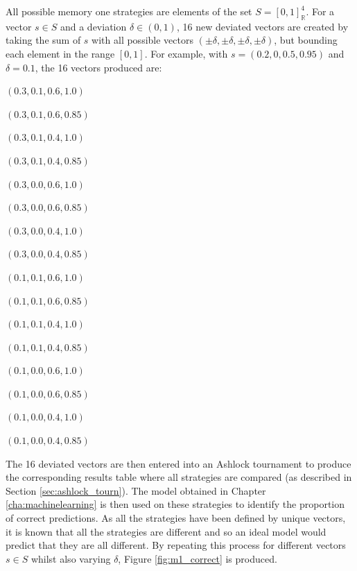 All possible memory one strategies are elements of the set $S = [0, 1]^4_{\mathbb{R}}$.
For a vector $s \in S$ and a deviation $\delta \in (0, 1)$, 16 new deviated vectors are created by taking the sum of $s$ with all possible vectors $(\pm \delta, \pm \delta, \pm \delta, \pm \delta)$, but bounding each element in the range $[0, 1]$.
For example, with $s = (0.2, 0, 0.5, 0.95)$ and $\delta = 0.1$, the 16 vectors produced are:

\begin{itemize}
\begin{multicols}{4}
  \item $(0.3, 0.1, 0.6, 1.0)$
  \item $(0.3, 0.1, 0.6, 0.85)$
  \item $(0.3, 0.1, 0.4, 1.0)$
  \item $(0.3, 0.1, 0.4, 0.85)$
  \item $(0.3, 0.0, 0.6, 1.0)$
  \item $(0.3, 0.0, 0.6, 0.85)$
  \item $(0.3, 0.0, 0.4, 1.0)$
  \item $(0.3, 0.0, 0.4, 0.85)$
  \item $(0.1, 0.1, 0.6, 1.0)$
  \item $(0.1, 0.1, 0.6, 0.85)$
  \item $(0.1, 0.1, 0.4, 1.0)$
  \item $(0.1, 0.1, 0.4, 0.85)$
  \item $(0.1, 0.0, 0.6, 1.0)$
  \item $(0.1, 0.0, 0.6, 0.85)$
  \item $(0.1, 0.0, 0.4, 1.0)$
  \item $(0.1, 0.0, 0.4, 0.85)$
\end{multicols}
\end{itemize}

The 16 deviated vectors are then entered into an Ashlock tournament to produce the corresponding results table where all strategies are compared (as described in Section \ref{sec:ashlock_tourn}).
The model obtained in Chapter \ref{cha:machinelearning} is then used on these strategies to identify the proportion of correct predictions.
As all the strategies have been defined by unique vectors, it is known that all the strategies are different and so an ideal model would predict that they are all different.
By repeating this process for different vectors $s \in S$ whilst also varying $\delta$, Figure \ref{fig:m1_correct} is produced.

